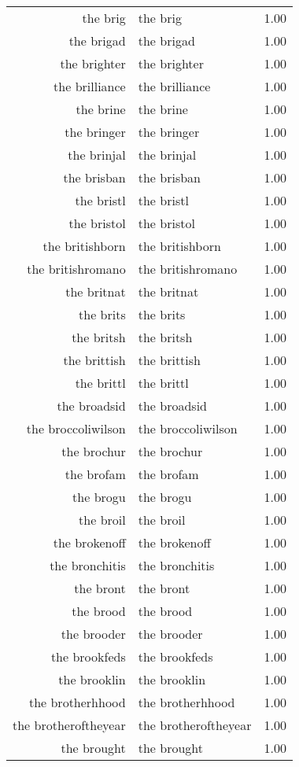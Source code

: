 \begin{table}[ht]
\begin{tabular}{rlr}
  the brig & the brig & 1.00 \\ 
  the brigad & the brigad & 1.00 \\ 
  the brighter & the brighter & 1.00 \\ 
  the brilliance & the brilliance & 1.00 \\ 
  the brine & the brine & 1.00 \\ 
  the bringer & the bringer & 1.00 \\ 
  the brinjal & the brinjal & 1.00 \\ 
  the brisban & the brisban & 1.00 \\ 
  the bristl & the bristl & 1.00 \\ 
  the bristol & the bristol & 1.00 \\ 
  the britishborn & the britishborn & 1.00 \\ 
  the britishromano & the britishromano & 1.00 \\ 
  the britnat & the britnat & 1.00 \\ 
  the brits & the brits & 1.00 \\ 
  the britsh & the britsh & 1.00 \\ 
  the brittish & the brittish & 1.00 \\ 
  the brittl & the brittl & 1.00 \\ 
  the broadsid & the broadsid & 1.00 \\ 
  the broccoliwilson & the broccoliwilson & 1.00 \\ 
  the brochur & the brochur & 1.00 \\ 
  the brofam & the brofam & 1.00 \\ 
  the brogu & the brogu & 1.00 \\ 
  the broil & the broil & 1.00 \\ 
  the brokenoff & the brokenoff & 1.00 \\ 
  the bronchitis & the bronchitis & 1.00 \\ 
  the bront & the bront & 1.00 \\ 
  the brood & the brood & 1.00 \\ 
  the brooder & the brooder & 1.00 \\ 
  the brookfeds & the brookfeds & 1.00 \\ 
  the brooklin & the brooklin & 1.00 \\ 
  the brotherhhood & the brotherhhood & 1.00 \\ 
  the brotheroftheyear & the brotheroftheyear & 1.00 \\ 
  the brought & the brought & 1.00 \\ 

\end{tabular}
\end{table}
